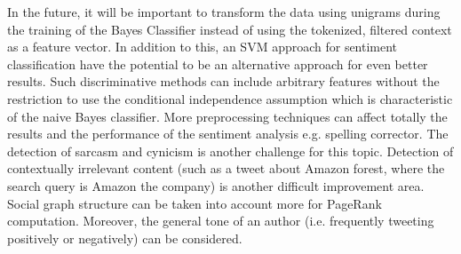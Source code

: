 In the future, it will be important to transform the data using unigrams during the training of the Bayes Classifier instead of using the tokenized, filtered context as a feature vector. In addition to this, an SVM approach for sentiment classification have the potential to be an alternative approach for even better results. Such discriminative methods can include arbitrary features without the restriction to use the conditional independence assumption which is characteristic of the naive Bayes classifier. More preprocessing techniques can affect totally the results and the performance of the sentiment analysis e.g. spelling corrector. The detection of sarcasm and cynicism is another challenge for this topic. Detection of contextually irrelevant content (such as a tweet about Amazon forest, where the search query is Amazon the company) is another difficult improvement area. Social graph structure can be taken into account more for PageRank computation. Moreover, the general tone of an author (i.e. frequently tweeting positively or negatively) can be considered.
